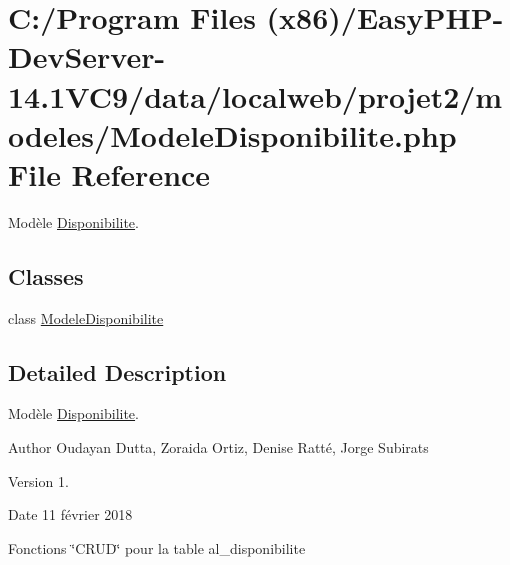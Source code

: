 \hypertarget{_modele_disponibilite_8php}{}\section{C\+:/\+Program Files (x86)/\+Easy\+P\+H\+P-\/\+Dev\+Server-\/14.1\+V\+C9/data/localweb/projet2/modeles/\+Modele\+Disponibilite.php File Reference}
\label{_modele_disponibilite_8php}


Modèle \hyperlink{class_disponibilite}{Disponibilite}.  


\subsection*{Classes}
\begin{DoxyCompactItemize}
\item 
class \hyperlink{class_modele_disponibilite}{Modele\+Disponibilite}
\end{DoxyCompactItemize}


\subsection{Detailed Description}
Modèle \hyperlink{class_disponibilite}{Disponibilite}. 

\begin{DoxyAuthor}{Author}
Oudayan Dutta, Zoraida Ortiz, Denise Ratté, Jorge Subirats 
\end{DoxyAuthor}
\begin{DoxyVersion}{Version}
1. 
\end{DoxyVersion}
\begin{DoxyDate}{Date}
11 février 2018
\end{DoxyDate}
Fonctions \char`\"{}\+C\+R\+U\+D\char`\"{} pour la table al\+\_\+disponibilite 